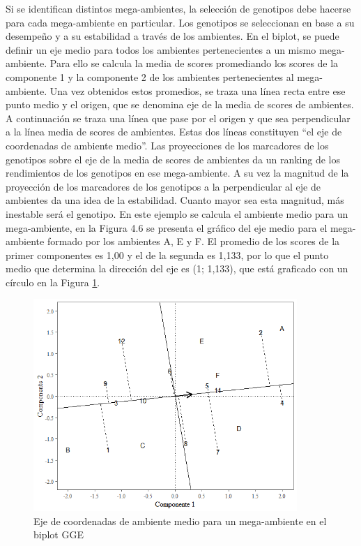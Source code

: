 Si se identifican distintos mega-ambientes, la selección de genotipos debe hacerse para cada mega-ambiente en particular. Los genotipos se seleccionan en base a su desempeño y a su estabilidad a través de los ambientes.
En el biplot, se puede definir un eje medio para todos los ambientes pertenecientes a un mismo mega-ambiente. Para ello se calcula la media de scores promediando los scores de la componente 1 y la componente 2 de los ambientes pertenecientes al mega-ambiente. Una vez obtenidos estos promedios, se traza una línea recta entre ese punto medio y el origen, que se denomina eje de la media de scores de ambientes. A continuación se traza una línea que pase por el origen y que sea perpendicular a la línea
media de scores de ambientes. Estas dos líneas constituyen ``el eje de coordenadas de ambiente medio''.
Las proyecciones de los marcadores de los genotipos sobre el eje de la media de scores de ambientes da un ranking de los rendimientos de los genotipos en ese mega-ambiente. A su vez la magnitud de la proyección de los marcadores de los genotipos a la perpendicular al eje de ambientes da una idea de la estabilidad. Cuanto mayor sea esta magnitud, más inestable será el genotipo.
En este ejemplo se calcula el ambiente medio para un mega-ambiente, en la Figura 4.6 se presenta el gráfico del eje medio para el mega-ambiente formado por los ambientes A, E y F. El promedio de los scores de la primer componentes es 1,00 y el de la segunda es 1,133, por lo que el punto medio que determina la dirección del eje es (1; 1,133), que está graficado con un círculo en la Figura \ref{fig:fig316}.

\begin{figure}[h]
	\begin{center}
		\includegraphics[width=10cm]{./Graficos/mean_stab_GGE.png}
	\end{center}
	\caption{Eje de coordenadas de ambiente medio para un mega-ambiente en el biplot GGE}
	\label{fig:fig316}
\end{figure}


